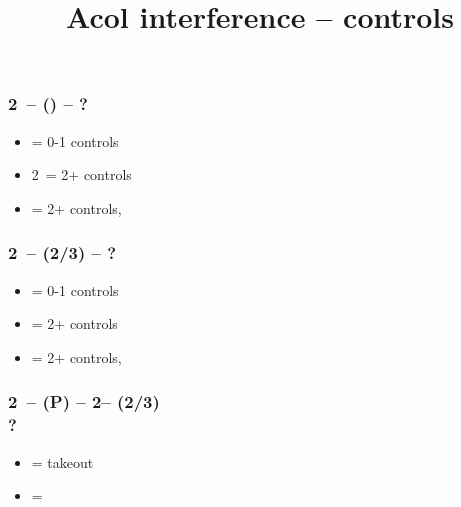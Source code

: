\documentclass[12pt, a4paper]{article}
\title{Acol interference -- controls}
\author{}
\begin{document}
\maketitle


\subsubsection*{2\clubs\ -- (\dbl) -- ?}
\begin{itemize}
    \item \rdbl = 0-1 controls
    \item 2\hearts\ = 2+ controls
    \item {} = 2+ controls, \nat
\end{itemize}

\subsubsection*{2\clubs\ -- (2/3) -- ?}
\begin{itemize}
    \item \dbl = 0-1 controls
    \item \pass = 2+ controls
    \item {} = 2+ controls, \nat
\end{itemize}

\subsubsection*{2\clubs\ -- (P) -- 2\diams -- (2/3)\\
                ?}
\begin{itemize}
    \item \dbl = takeout
    \item \pass = \then \dbl
\end{itemize}

\end{document}
